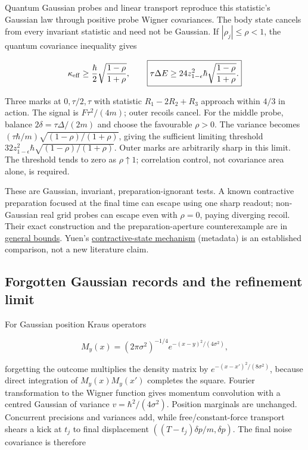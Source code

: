 \documentclass[11pt,a4paper]{article}
\begin{document}
Quantum Gaussian probes and linear transport reproduce this statistic's
Gaussian law through positive probe Wigner covariances. The body state
cancels from every invariant statistic and need not be Gaussian. If
\(|\rho_j|\le\rho<1\), the quantum covariance inequality gives

\[\kappa_{\rm eff}\ge\frac\hbar2\sqrt{\frac{1-\rho}{1+\rho}},\qquad
\boxed{\tau\Delta E\ge24z_{1-\epsilon}^2\hbar
 \sqrt{\frac{1-\rho}{1+\rho}}.}\]

Three marks at \(0,\tau/2,\tau\) with statistic \(R_1-2R_2+R_3\)
approach within \(4/3\) in action. The signal is \(F\tau^2/(4m)\); outer
recoils cancel. For the middle probe, balance
\(2\delta=\tau\Delta/(2m)\) and choose the favourable \(\rho>0\). The
variance becomes \((\tau\hbar/m)\sqrt{(1-\rho)/(1+\rho)}\), giving the
sufficient limiting threshold
\(32z_{1-\epsilon}^2\hbar\sqrt{(1-\rho)/(1+\rho)}\). Outer marks are
arbitrarily sharp in this limit. The threshold tends to zero as
\(\rho\uparrow1\); correlation control, not covariance area alone, is
required.

These are Gaussian, invariant, preparation-ignorant tests. A known
contractive preparation focused at the final time can escape using one
sharp readout; non-Gaussian real grid probes can escape even with
\(\rho=0\), paying diverging recoil. Their exact construction and the
preparation-aperture counterexample are in
\href{record-distance-path-length.md}{general bounds}. Yuen's
\href{https://doi.org/10.1103/PhysRevLett.51.719}{contractive-state
mechanism} (metadata) is an established comparison, not a new literature
claim.

\hypertarget{forgotten-gaussian-records-and-the-refinement-limit}{%
\subsection{Forgotten Gaussian records and the refinement
limit}\label{forgotten-gaussian-records-and-the-refinement-limit}}

For Gaussian position Kraus operators

\[M_y(x)=(2\pi\sigma^2)^{-1/4}e^{-(x-y)^2/(4\sigma^2)},\]

forgetting the outcome multiplies the density matrix by
\(e^{-(x-x')^2/(8\sigma^2)}\), because direct integration of
\(M_y(x)M_y(x')\) completes the square. Fourier transformation to the
Wigner function gives momentum convolution with a centred Gaussian of
variance \(v=\hbar^2/(4\sigma^2)\). Position marginals are unchanged.
Concurrent precisions and variances add, while free/constant-force
transport shears a kick at \(t_j\) to final displacement
\(((T-t_j)\delta p/m,\delta p)\). The final noise covariance is
therefore
\end{document}
